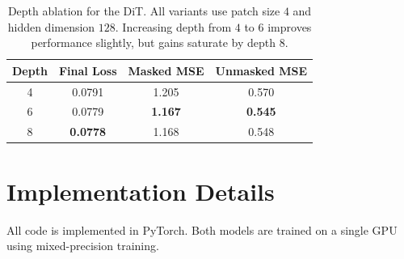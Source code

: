 \documentclass{article}
\begin{document}
\begin{table}[H]
    \caption{Depth ablation for the DiT. All variants use patch size $4$ and hidden dimension $128$. Increasing depth from $4$ to $6$ improves performance slightly, but gains saturate by depth $8$.}
    \label{tab:ablation-depth}
    \centering
    \begin{tabular}{cccc}
    \toprule
    Depth & Final Loss & Masked MSE & Unmasked MSE \\
    \midrule
    4 & 0.0791 & 1.205 & 0.570 \\
    6 & 0.0779 & \textbf{1.167} & \textbf{0.545} \\
    8 & \textbf{0.0778} & 1.168 & 0.548 \\
    \bottomrule
    \end{tabular}
\end{table}


\section{Implementation Details}
\label{app:implementation}
All code is implemented in PyTorch.
Both models are trained on a single GPU using mixed-precision training.
\end{document}
